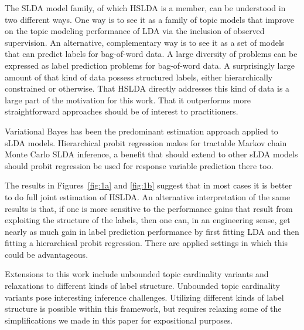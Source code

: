 

The SLDA model family, of which HSLDA is a member, can be understood in two
different ways. One way is to see it as a family of topic models that improve
on the topic modeling performance of LDA via the inclusion of observed
supervision. An alternative, complementary way is to see it as a set of models
that can predict labels for bag-of-word data. A large diversity of problems
can be expressed as label prediction problems for bag-of-word data. A
surprisingly large amount of that kind of data possess structured labels,
either hierarchically constrained or otherwise. That HSLDA directly addresses
this kind of data is a large part of the motivation for this work. That it
outperforms more straightforward approaches should be of interest to
practitioners.

Variational Bayes has been the predominant estimation approach applied to sLDA
models. Hierarchical probit regression makes for tractable Markov chain Monte
Carlo SLDA inference, a benefit that should extend to other sLDA models should
probit regression be used for response variable prediction there too.

The results in Figures~\ref{fig:1a} and \ref{fig:1b} suggest that in most cases
it is better to do full joint estimation of HSLDA.  An alternative
interpretation of the same results is that, if one is more sensitive to the
performance gains that result from exploiting the structure of the labels, then
one can, in an engineering sense, get nearly as much gain in label prediction
performance by first fitting LDA and then fitting a hierarchical probit
regression.  There are applied settings in which this could be advantageous.

Extensions to this work include unbounded topic cardinality variants and
relaxations to different kinds of label structure.  Unbounded topic cardinality
variants pose interesting inference challenges.  Utilizing different kinds of
label structure is possible within this framework, but requires relaxing some
of the simplifications we made in this paper for expositional purposes.

